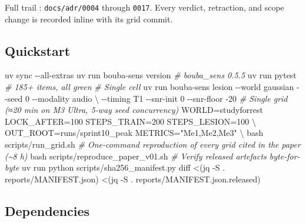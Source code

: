 \documentclass[
]{article}
\newenvironment{Shaded}{}{}
\newcommand{\AttributeTok}[1]{\textcolor[rgb]{0.49,0.56,0.16}{#1}}
\newcommand{\CommentTok}[1]{\textcolor[rgb]{0.38,0.63,0.69}{\textit{#1}}}
\newcommand{\DataTypeTok}[1]{\textcolor[rgb]{0.56,0.13,0.00}{#1}}
\newcommand{\ExtensionTok}[1]{#1}
\newcommand{\FunctionTok}[1]{\textcolor[rgb]{0.02,0.16,0.49}{#1}}
\newcommand{\NormalTok}[1]{#1}
\newcommand{\OperatorTok}[1]{\textcolor[rgb]{0.40,0.40,0.40}{#1}}
\newcommand{\StringTok}[1]{\textcolor[rgb]{0.25,0.44,0.63}{#1}}
\newcommand{\VariableTok}[1]{\textcolor[rgb]{0.10,0.09,0.49}{#1}}
\begin{document}
Full trail : \texttt{docs/adr/0004} through \texttt{0017}. Every
verdict, retraction, and scope change is recorded inline with its grid
commit.

\subsection{Quickstart}\label{quickstart}

\begin{Shaded}
\begin{Highlighting}[]
\ExtensionTok{uv}\NormalTok{ sync }\AttributeTok{{-}{-}all{-}extras}
\ExtensionTok{uv}\NormalTok{ run bouba{-}sens version          }\CommentTok{\# bouba\_sens 0.5.5}
\ExtensionTok{uv}\NormalTok{ run pytest                      }\CommentTok{\# 185+ items, all green}
\CommentTok{\# Single cell}
\ExtensionTok{uv}\NormalTok{ run bouba{-}sens lesion }\AttributeTok{{-}{-}world}\NormalTok{ gaussian }\AttributeTok{{-}{-}seed}\NormalTok{ 0 }\AttributeTok{{-}{-}modality}\NormalTok{ audio }\DataTypeTok{\textbackslash{}}
    \AttributeTok{{-}{-}timing}\NormalTok{ T1 }\AttributeTok{{-}{-}snr{-}init}\NormalTok{ 0 }\AttributeTok{{-}{-}snr{-}floor} \AttributeTok{{-}20}
\CommentTok{\# Single grid (≈20 min on M3 Ultra, 5{-}way seed concurrency)}
\VariableTok{WORLD}\OperatorTok{=}\NormalTok{studyforrest }\VariableTok{LOCK\_AFTER}\OperatorTok{=}\NormalTok{100 }\VariableTok{STEPS\_TRAIN}\OperatorTok{=}\NormalTok{200 }\VariableTok{STEPS\_LESION}\OperatorTok{=}\NormalTok{100 }\DataTypeTok{\textbackslash{}}
    \VariableTok{OUT\_ROOT}\OperatorTok{=}\NormalTok{runs/sprint10\_peak }\VariableTok{METRICS}\OperatorTok{=}\StringTok{"Me1,Me2,Me3"} \DataTypeTok{\textbackslash{}}
    \FunctionTok{bash}\NormalTok{ scripts/run\_grid.sh}
\CommentTok{\# One{-}command reproduction of every grid cited in the paper (\textasciitilde{}8 h)}
\FunctionTok{bash}\NormalTok{ scripts/reproduce\_paper\_v01.sh}
\CommentTok{\# Verify released artefacts byte{-}for{-}byte}
\ExtensionTok{uv}\NormalTok{ run python scripts/sha256\_manifest.py}
\FunctionTok{diff} \OperatorTok{\textless{}(}\ExtensionTok{jq} \AttributeTok{{-}S}\NormalTok{ . reports/MANIFEST.json}\OperatorTok{)} \OperatorTok{\textless{}(}\ExtensionTok{jq} \AttributeTok{{-}S}\NormalTok{ . reports/MANIFEST.json.released}\OperatorTok{)}
\end{Highlighting}
\end{Shaded}

\subsection{Dependencies}\label{dependencies}
\end{document}

